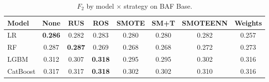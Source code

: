 \begin{table}[ht]
\centering
\caption{$F_2$ by model $\times$ strategy on BAF Base.}
\label{tab:factorial_baf_f2}
\begin{tabular}{l c c c c c c c}
\toprule
Model & None & RUS & ROS & SMOTE & SM+T & SMOTEENN & Weights \\
\midrule
LR         & \textbf{0.286} & 0.282 & 0.283 & 0.280 & 0.280 & 0.282 & 0.257 \\
RF         & 0.287 & \textbf{0.287} & 0.269 & 0.268 & 0.268 & 0.272 & 0.273 \\
LGBM       & 0.312 & 0.307 & \textbf{0.318} & 0.295 & 0.295 & 0.302 & 0.316 \\
CatBoost   & 0.317 & 0.317 & \textbf{0.318} & 0.302 & 0.302 & 0.310 & 0.316 \\
\bottomrule
\end{tabular}
\end{table}